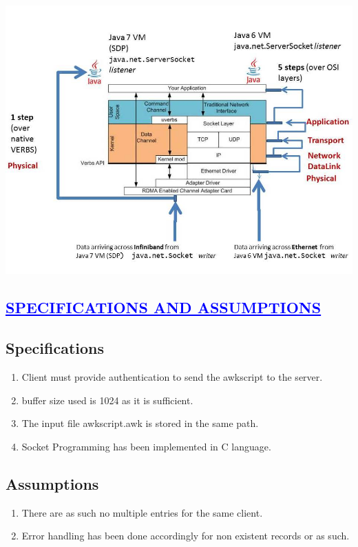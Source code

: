 \documentclass[a4paper,12pt]{report}
\begin{document}
\begin{center}
\includegraphics[width=12 cm,height=12 cm]{./flow.jpg}  
\end{center}
\begin{center}
\chapter{\textcolor{blue}{\underline {SPECIFICATIONS AND ASSUMPTIONS}}}
\end{center}
\section*{Specifications}
\begin{enumerate}
 

\item Client must provide authentication to send the awkscript to the server.
\item buffer size used is 1024 as it is sufficient.
\item The input file awkscript.awk is stored in the same path.
\item Socket Programming has been implemented in C language.
\end{enumerate}

\section*{Assumptions}
\begin{enumerate}
\item There are as such no multiple entries for the same client.

\item Error handling has been done accordingly for non existent records or as such.
\end{enumerate}
 
\end{document}
